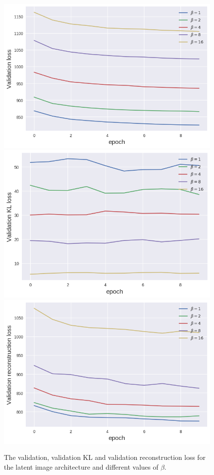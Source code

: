 \begin{figure}[h!]
\centering
\captionsetup{justification=centering}
    \includegraphics[scale=0.5]{figures/results/latent_image/val_loss.png}
    \includegraphics[scale=0.5]{figures/results/latent_image/val_kl_loss.png}
    \includegraphics[scale=0.5]{figures/results/latent_image/val_reconstruction_loss.png}
\caption{The validation, validation KL and validation reconstruction loss for the latent image architecture and different values of $\beta$.}
\label{fig:latent_image_graphs}
\end{figure}



